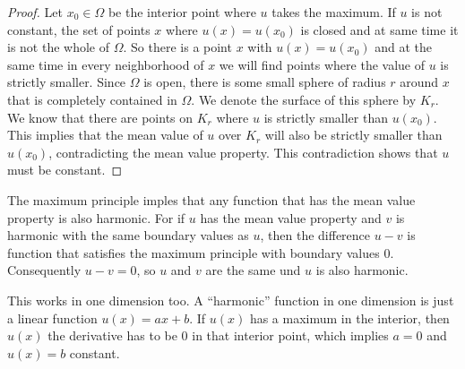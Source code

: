 \begin{proof}
Let $x_0\in\Omega$ be the interior point where $u$ takes the maximum.
If $u$ is not constant, the set of points $x$ where $u(x)=u(x_0)$ is
closed and at same time it is not the whole of $\Omega$.
So there is a point $x$ with $u(x)=u(x_0)$ and at the same time
in every neighborhood of $x$ we will find points where the value of
$u$ is strictly smaller.
Since $\Omega$ is open, there is some small sphere of radius $r$
around $x$ that is completely contained in $\Omega$.
We denote the surface of this sphere by $K_r$.
We know that there are points on $K_r$ where $u$ is strictly smaller
than $u(x_0)$.
This implies that the mean value of $u$ over $K_r$ will also be
strictly smaller than $u(x_0)$, contradicting the mean value property.
This contradiction shows that $u$ must be constant.
\end{proof}

The maximum principle imples that any function that has the
mean value property is also harmonic.
For if $u$ has the mean value property and $v$ is harmonic with
the same boundary values as $u$, then the difference $u-v$ is 
function that satisfies the maximum principle with boundary
values $0$.
Consequently $u-v=0$, so $u$ and $v$ are the same und $u$ is also
harmonic.

This works in one dimension too.
A ``harmonic'' function in one dimension is just a linear function
$u(x)=ax+b$.
If $u(x)$ has a maximum in the interior, then $u(x)$ the derivative
has to be $0$ in that interior point, which implies $a=0$ and $u(x)=b$
constant.

